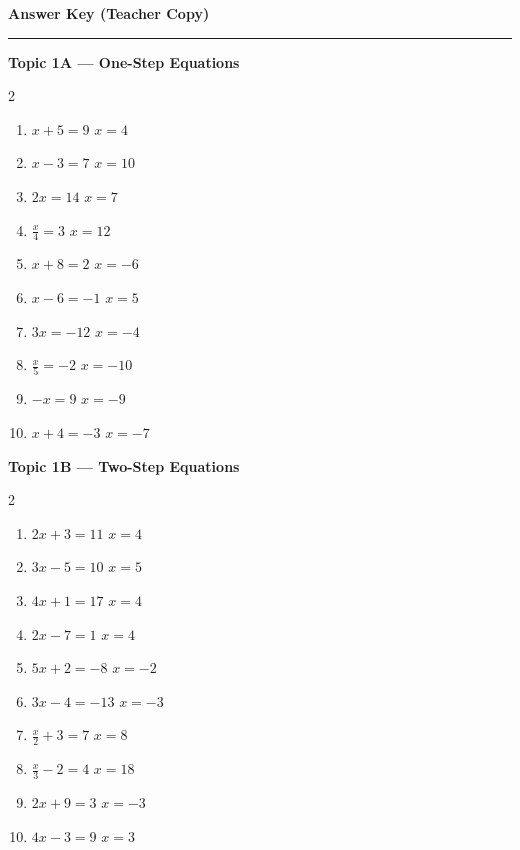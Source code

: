 \documentclass[12pt]{article}
\begin{document}
\newpage

\begin{center}
  {\large\bfseries Answer Key \quad (Teacher Copy)}\\[4pt]
  \rule{\textwidth}{1.2pt}
\end{center}

\vspace{8pt}

\noindent\textbf{Topic 1A --- One-Step Equations}
\begin{multicols}{2}
\begin{enumerate}[label=\textbf{\arabic*.}, itemsep=3pt]
  \item $x + 5 = 9$ \hfill $x = 4$
  \item $x - 3 = 7$ \hfill $x = 10$
  \item $2x = 14$ \hfill $x = 7$
  \item $\frac{x}{4} = 3$ \hfill $x = 12$
  \item $x + 8 = 2$ \hfill $x = -6$
  \item $x - 6 = -1$ \hfill $x = 5$
  \item $3x = -12$ \hfill $x = -4$
  \item $\frac{x}{5} = -2$ \hfill $x = -10$
  \item $-x = 9$ \hfill $x = -9$
  \item $x + 4 = -3$ \hfill $x = -7$
\end{enumerate}
\end{multicols}

\vspace{8pt}
\noindent\textbf{Topic 1B --- Two-Step Equations}
\begin{multicols}{2}
\begin{enumerate}[label=\textbf{\arabic*.}, itemsep=3pt]
  \item $2x + 3 = 11$ \hfill $x = 4$
  \item $3x - 5 = 10$ \hfill $x = 5$
  \item $4x + 1 = 17$ \hfill $x = 4$
  \item $2x - 7 = 1$ \hfill $x = 4$
  \item $5x + 2 = -8$ \hfill $x = -2$
  \item $3x - 4 = -13$ \hfill $x = -3$
  \item $\frac{x}{2} + 3 = 7$ \hfill $x = 8$
  \item $\frac{x}{3} - 2 = 4$ \hfill $x = 18$
  \item $2x + 9 = 3$ \hfill $x = -3$
  \item $4x - 3 = 9$ \hfill $x = 3$
\end{enumerate}
\end{multicols}
\end{document}
